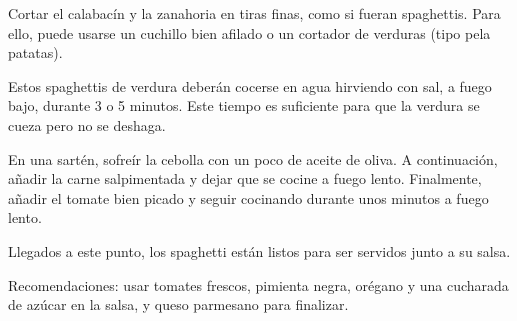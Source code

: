 Cortar el calabacín y la zanahoria en tiras finas, como si fueran spaghettis. Para ello, puede usarse un cuchillo bien afilado o un cortador de verduras (tipo pela patatas).

Estos spaghettis de verdura deberán cocerse en agua hirviendo con sal, a fuego bajo, durante 3 o 5 minutos. Este tiempo es suficiente para que la verdura se cueza pero no se deshaga.

En una sartén, sofreír la cebolla con un poco de aceite de oliva. A continuación, añadir la carne salpimentada y dejar que se cocine a fuego lento. Finalmente, añadir el tomate bien picado y seguir cocinando durante unos minutos a fuego lento.

Llegados a este punto, los spaghetti están listos para ser servidos junto a su salsa.

Recomendaciones: usar tomates frescos, pimienta negra, orégano y una cucharada de azúcar en la salsa, y queso parmesano para finalizar.
